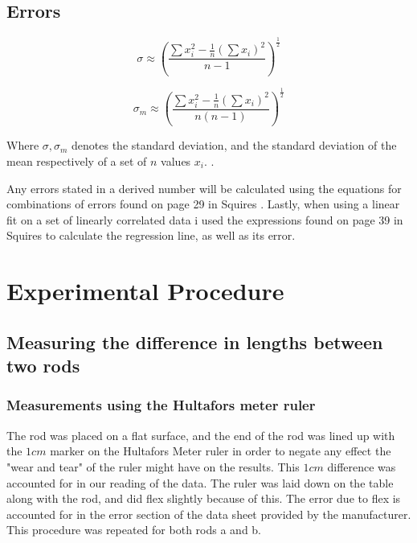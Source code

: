 \documentclass[11pt,a4paper]{article}
\begin{document}
  \subsection{Errors}
    \begin{equation}
    \label{eqn:sigma}
      \sigma \approx \left(
      \frac{\sum x_i^2 - \frac{1}{n}(\sum x_i)^2}
      {n - 1}
      \right)^\frac{1}{2}
    \end{equation}
    
    \begin{equation}
      \label{eqn:sigma_m}
      \sigma_m \approx \left(
      \frac{\sum x_i^2 - \frac{1}{n}(\sum x_i)^2}
      {n(n - 1)}
      \right)^\frac{1}{2}
    \end{equation}

    Where $\sigma, \sigma_m$ denotes the standard deviation, and the standard deviation of the mean respectively of a set of $n$ values $x_i$. \cite{squires}.

    Any errors stated in a derived number will be calculated using the equations for combinations of errors found on page 29 in Squires \cite{squires}. Lastly, when using a linear fit on a set of linearly correlated data i used the expressions found on page 39 in Squires \cite{squires} to calculate the regression line, as well as its error.

\section{\label{sec:exp_proced}Experimental Procedure}
 
  \subsection{Measuring the difference in lengths between two rods}
    \subsubsection{Measurements using the Hultafors meter ruler}
      The rod was placed on a flat surface, and the end of the rod was lined up with the $1cm$ marker on the Hultafors Meter ruler in order to negate any effect the "wear and tear" of the ruler might have on the results. This $1cm$ difference was accounted for in our reading of the data. The ruler was laid down on the table along with the rod, and did flex slightly because of this. The error due to flex is accounted for in the error section of the data sheet provided by the manufacturer. This procedure was repeated for both rods a and b.
\end{document}

